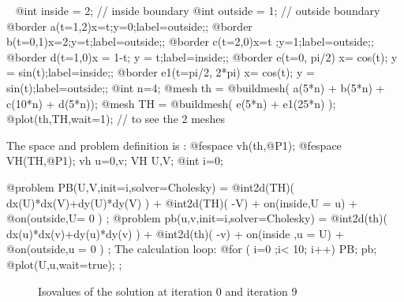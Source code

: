\documentclass[a4paper,twoside,12pt]{book}
\begin{document}
\begin{example}~
 \bFF
@int inside = 2;  //  inside boundary
@int outside = 1; //  outside boundary
@border a(t=1,2){x=t;y=0;label=outside;};
@border b(t=0,1){x=2;y=t;label=outside;};
@border c(t=2,0){x=t ;y=1;label=outside;};
@border d(t=1,0){x = 1-t; y = t;label=inside;};
@border e(t=0, pi/2){ x= cos(t); y = sin(t);label=inside;};
@border e1(t=pi/2, 2*pi){ x= cos(t); y = sin(t);label=outside;};
@int n=4;
@mesh th = @buildmesh( a(5*n) + b(5*n) + c(10*n) + d(5*n));
@mesh TH = @buildmesh( e(5*n) + e1(25*n) );
@plot(th,TH,wait=1);  //  to see the 2 meshes
\eFF

The space  and problem definition is :
\bFF
@fespace vh(th,@P1);
@fespace VH(TH,@P1);
vh u=0,v; VH U,V;
@int i=0;

@problem PB(U,V,init=i,solver=Cholesky) =
    @int2d(TH)( dx(U)*dx(V)+dy(U)*dy(V) )
  + @int2d(TH)( -V) + on(inside,U = u)  + @on(outside,U= 0 ) ;
@problem pb(u,v,init=i,solver=Cholesky) =
    @int2d(th)( dx(u)*dx(v)+dy(u)*dy(v) )
  + @int2d(th)( -v) + on(inside ,u = U) + @on(outside,u = 0 ) ;
\eFF
 The  calculation loop:
\bFF
@for ( i=0 ;i< 10; i++)
{
   PB;
   pb;
   @plot(U,u,wait=true);
};
\eFF
\end{example}

\begin{figure}[hbt]
\caption{  Isovalues of the solution at  iteration 0  and iteration 9}
\end{figure}
\end{document}
